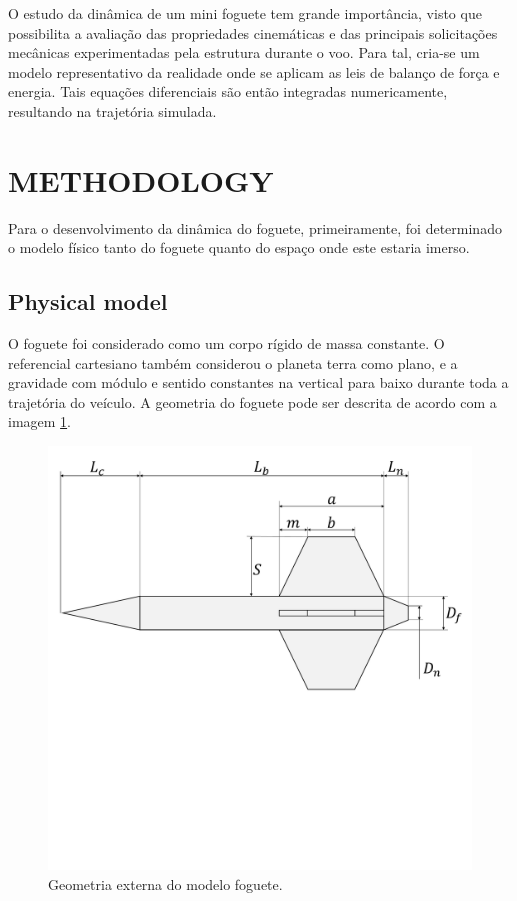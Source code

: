 \documentclass[10pt,fleqn,a4paper,twoside]{article}
\begin{document}
O estudo da dinâmica de um mini foguete tem grande importância, visto que possibilita a avaliação das propriedades cinemáticas e das principais solicitações mecânicas experimentadas pela estrutura durante o voo. Para tal, cria-se um modelo representativo da realidade onde se aplicam as leis de balanço de força e energia. Tais equações diferenciais são então integradas numericamente, resultando na trajetória simulada.

\section{METHODOLOGY}
Para o desenvolvimento da dinâmica do foguete, primeiramente, foi determinado o modelo físico tanto do foguete quanto do espaço onde este estaria imerso.


\subsection{Physical model}
O foguete foi considerado como um corpo rígido de massa constante. O referencial cartesiano também considerou o planeta terra como plano, e a gravidade com módulo e sentido constantes na vertical para baixo durante toda a trajetória do veículo. A geometria do foguete pode ser descrita de acordo com a imagem \ref{geometria_foguete}.

\begin{figure}[h!]
	\centering
	\includegraphics[trim = {0cm 13cm 0cm 0cm}, clip , angle=0, scale=0.30]{imagens/foguete_statera}
	\caption{Geometria externa do modelo foguete.}
	\label{geometria_foguete}
\end{figure}
\end{document}
